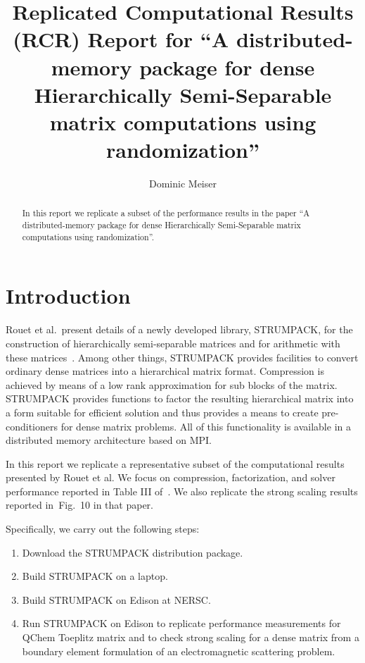 \documentclass{acmsmall}
\begin{document}
\title{Replicated Computational Results (RCR) Report for
  ``A distributed-memory package for dense Hierarchically
    Semi-Separable matrix computations using randomization''}

\author{Dominic Meiser
}

\newcommand{\strumpack}{STRUMPACK}

\begin{abstract}
  In this report we replicate a subset of the performance results
  in the paper ``A distributed-memory package for dense
  Hierarchically Semi-Separable matrix computations using
  randomization''.
\end{abstract}

\maketitle 

\section{Introduction}

Rouet et al.\ present details of a newly developed library,
\strumpack{}, for the construction of hierarchically
semi-separable matrices and for arithmetic with these
matrices~\cite{rouet:strumpack}.  Among other things,
\strumpack{} provides facilities to convert ordinary dense
matrices into a hierarchical matrix format.  Compression is
achieved by means of a low rank approximation for sub blocks of
the matrix.  \strumpack{} provides functions to factor the
resulting hierarchical matrix into a form suitable for efficient
solution and thus provides a means to create pre-conditioners for
dense matrix problems.  All of this functionality is available in
a distributed memory architecture based on MPI.

In this report we replicate a representative subset of the
computational results presented by Rouet et al.  We focus on
compression, factorization, and solver performance reported in
Table III of~\cite{rouet:strumpack}.  We also replicate the
strong scaling results reported in~Fig.~10
in that paper.

Specifically, we carry out the following steps:
\begin{enumerate}
  \item Download the \strumpack{} distribution package.
  \item Build \strumpack{} on a laptop.
  \item Build \strumpack{} on Edison at NERSC.
  \item Run \strumpack{} on Edison to replicate performance
    measurements for QChem Toeplitz matrix and to check strong
    scaling for a dense matrix from a boundary element formulation
    of an electromagnetic scattering problem.
\end{enumerate}
\end{document}

